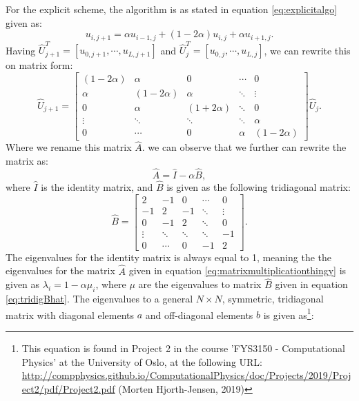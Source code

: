 \documentclass[reprint,english,notitlepage]{revtex4-1}  %
\begin{document}
For the explicit scheme, the algorithm is as stated in equation \ref{eq:explicitalgo} given as:
\begin{equation}
    u_{i,j+1} = \alpha u_{i-1,j} + (1-2\alpha)u_{i,j} + \alpha u_{i+1,j}.    
\end{equation}
Having $\hat{U}_{j+1}^T = [u_{0,j+1},\cdots,u_{L,j+1}]$ and $\hat{U}_{j}^T = [u_{0,j},\cdots,u_{L,j}]$, we can rewrite this on matrix form:
\begin{equation}
    \hat{U}_{j+1} = \begin{bmatrix} (1-2\alpha)&\alpha&0&\cdots&0\\\alpha&(1-2\alpha)&\alpha&\ddots&\vdots\\0&\alpha&(1+2\alpha)&\ddots&0\\\vdots&\ddots&\ddots&\ddots&\alpha\\0&\cdots&0&\alpha&(1-2\alpha) \end{bmatrix}\hat{U}_{j}.
\end{equation}
Where we rename this matrix $\hat{A}$. we can observe that we further can rewrite the matrix as:
\begin{equation}\label{eq:matrixmultiplicationthingy}
\hat{A} = \hat{I} - \alpha\hat{B},
\end{equation}
where $\hat{I}$ is the identity matrix, and $\hat{B}$ is given as the following tridiagonal matrix:
\begin{equation}\label{eq:tridigBhat}
    \hat{B} = \begin{bmatrix} 
    2&-1&0&\cdots&0\\
    -1&2&-1&\ddots&\vdots\\
    0&-1&2&\ddots&0\\
    \vdots&\ddots&\ddots&\ddots&-1\\
    0&\cdots&0&-1&2
    \end{bmatrix}.
\end{equation}
The eigenvalues for the identity matrix is always equal to 1, meaning the the eigenvalues for the matrix $\hat{A}$ given in equation \ref{eq:matrixmultiplicationthingy} is given as $\lambda_i = 1-\alpha\mu_i$, where $\mu$ are the eigenvalues to matrix $\hat{B}$ given in equation \ref{eq:tridigBhat}. The eigenvalues to a general $N\times N$, symmetric, tridiagonal matrix with diagonal elements $a$ and off-diagonal elements $b$ is given as\footnote{This equation is found in Project 2 in the course 'FYS3150 - Computational Physics' at the University of Oslo, at the following URL: \url{http://compphysics.github.io/ComputationalPhysics/doc/Projects/2019/Project2/pdf/Project2.pdf} (Morten Hjorth-Jensen, 2019)}:
\end{document}

